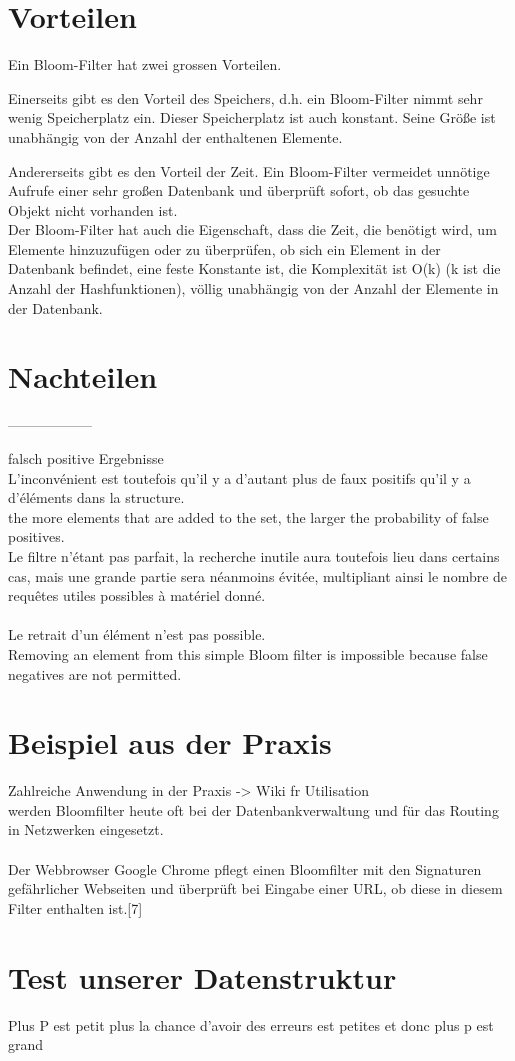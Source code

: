 \documentclass[12pt, letterpaper]{article}
\begin{document}
\section{Vorteilen}

Ein Bloom-Filter hat zwei grossen Vorteilen.

Einerseits gibt es den Vorteil des Speichers, d.h. ein Bloom-Filter nimmt sehr wenig Speicherplatz ein. Dieser Speicherplatz ist auch konstant. Seine Größe ist unabhängig von der Anzahl der enthaltenen Elemente.

Andererseits gibt es den Vorteil der Zeit. Ein Bloom-Filter vermeidet unnötige Aufrufe einer sehr großen Datenbank und überprüft sofort, ob das gesuchte Objekt nicht vorhanden ist.\\
Der Bloom-Filter hat auch die Eigenschaft, dass die Zeit, die benötigt wird, um Elemente hinzuzufügen oder zu überprüfen, ob sich ein Element in der Datenbank befindet, eine feste Konstante ist, die Komplexität ist O(k) (k ist die Anzahl der Hashfunktionen), völlig unabhängig von der Anzahl der Elemente in der Datenbank.

\section{Nachteilen}

------------------

falsch positive Ergebnisse\\
L'inconvénient est toutefois qu'il y a d'autant plus de faux positifs qu'il y a d'éléments dans la structure.\\
the more elements that are added to the set, the larger the probability of false positives.\\
Le filtre n'étant pas parfait, la recherche inutile aura toutefois lieu dans certains cas, mais une grande partie sera néanmoins évitée, multipliant ainsi le nombre de requêtes utiles possibles à matériel donné.\\
\\
Le retrait d'un élément n'est pas possible.\\
Removing an element from this simple Bloom filter is impossible because false negatives are not permitted.\\

\section{Beispiel aus der Praxis}

Zahlreiche Anwendung in der Praxis -> Wiki fr Utilisation\\
werden Bloomfilter heute oft bei der Datenbankverwaltung und für das Routing in Netzwerken eingesetzt.\\
\\
Der Webbrowser Google Chrome pflegt einen Bloomfilter mit den Signaturen gefährlicher Webseiten und überprüft bei Eingabe einer URL, ob diese in diesem Filter enthalten ist.[7]\\

\section{Test unserer Datenstruktur}
Plus P est petit plus la chance d'avoir des erreurs est petites et donc plus p est grand
\end{document}
